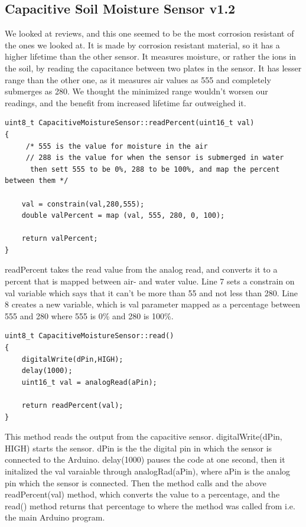 \documentclass[a4paper,12pt,twoside,openright,titlepage]{book}
\begin{document}
\subsection{Capacitive Soil Moisture Sensor v1.2}

We looked at reviews, and this one seemed to be the most corrosion resistant of the ones we looked at. It is made by corrosion resistant material, so it has a higher lifetime than the other sensor. It measures moisture, or rather the ions in the soil, by reading the capacitance between two plates in the sensor. It has lesser range than the other one, as it measures air values as 555 and completely submerges as 280. We thought the minimized range wouldn't worsen our readings, and the benefit from increased lifetime far outweighed it.

\begin{lstlisting}[language=Arduino]
uint8_t CapacitiveMoistureSensor::readPercent(uint16_t val)
{
     /* 555 is the value for moisture in the air
	 // 288 is the value for when the sensor is submerged in water
	  then sett 555 to be 0%, 288 to be 100%, and map the percent between them */
	
	val = constrain(val,280,555);
	double valPercent = map (val, 555, 280, 0, 100);

	return valPercent;
}

\end{lstlisting}
readPercent takes the read value from the analog read, and converts it to a percent that is mapped between air- and water value. Line 7 sets a constrain on val variable which says that it can't be more than 55 and not less than 280. Line 8 creates a new variable, which is val parameter mapped as a percentage between 555 and 280 where 555 is 0\% and 280 is 100\%.

\begin{lstlisting}[language=Arduino]
uint8_t CapacitiveMoistureSensor::read()
{
	digitalWrite(dPin,HIGH);
	delay(1000);
    uint16_t val = analogRead(aPin);
	
    return readPercent(val);
}
\end{lstlisting}

This method reads the output from the capacitive sensor. digitalWrite(dPin, HIGH) starts the sensor. dPin is the the digital pin in which the sensor is connected to the Arduino. delay(1000) pauses the code at one second, then it initalized the val varaiable through analogRad(aPin), where aPin is the analog pin which the sensor is connected. Then the method calls and  the above readPercent(val) method, which converts the value to a percentage, and the read() method returns that percentage to where the method was called from i.e. the main Arduino program.
\end{document}
